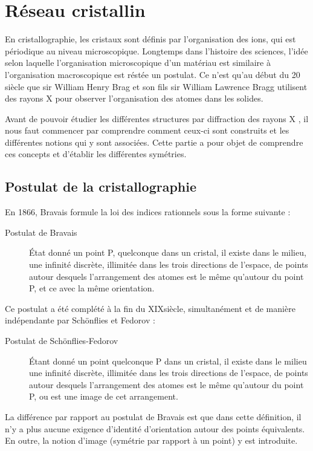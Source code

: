 \chapter{Réseau cristallin}
\label{ch:reseaucrist}

En cristallographie, les cristaux sont définis par l'organisation des ions, qui
est périodique au niveau microscopique. Longtemps dans l'histoire des sciences,
l'idée selon laquelle l'organisation microscopique d'un matériau est similaire à
l'organisation macroscopique est réstée un postulat. Ce n'est qu'au début du
20\ieme~ siècle que sir William Henry Brag et son fils sir William Lawrence
Bragg utilisent des rayons X pour observer l'organisation des atomes dans les
solides.

Avant de pouvoir étudier les différentes structures par diffraction des rayons X
, il nous faut commencer par comprendre comment ceux-ci sont construits et les
différentes notions qui y sont associées. Cette partie a pour objet de
comprendre ces concepts et d'établir les différentes symétries.

\section{Postulat de la cristallographie}

En 1866, Bravais formule la loi des indices rationnels sous la forme suivante :
\begin{description}
    \item[Postulat de Bravais]
État donné un point P, quelconque dans un cristal, il existe dans le milieu, une
infinité discrète, illimitée dans les trois directions de l'espace, de points 
autour desquels l'arrangement des atomes est le même qu'autour du point P, et ce
avec la même orientation.
\end{description}

Ce postulat a été complété à la fin du XIX\ieme siècle, simultanément et de
manière indépendante par Schönflies et Fedorov :
\begin{description}
 \item[Postulat de Schönflies-Fedorov]
Étant donné un point quelconque P dans un cristal, il existe dans le milieu une
infinité discrète, illimitée dans les trois directions de l'espace, de points
autour desquels l'arrangement des atomes est le même qu'autour du point P, ou
est une image de cet arrangement.
\end{description}

La différence par rapport au postulat de Bravais est que dans cette définition,
il n'y a plus aucune exigence d'identité d'orientation autour des points 
équivalents. En outre, la notion d'image (symétrie par rapport à un point) y est
introduite.

